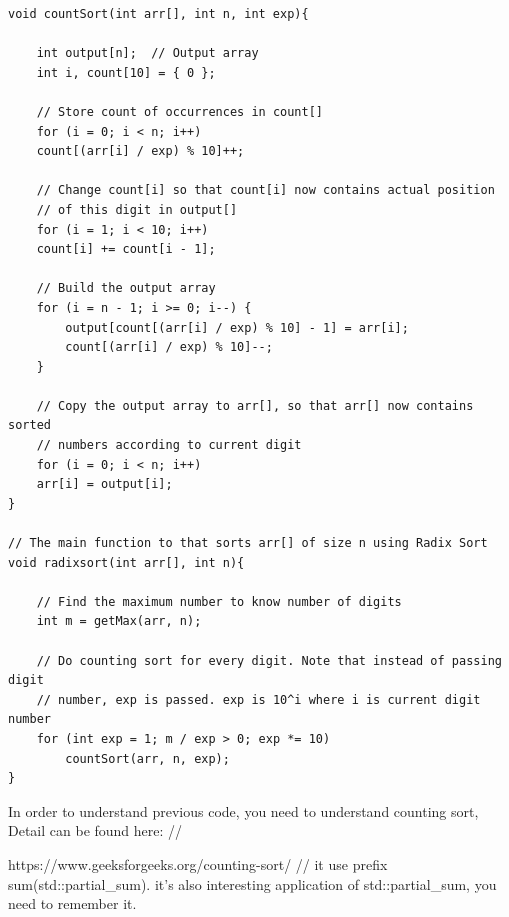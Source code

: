 \documentclass[a4paper,11pt,twoside]{book}
\begin{document}
\begin{lstlisting}
void countSort(int arr[], int n, int exp){
	
	int output[n];  // Output array
	int i, count[10] = { 0 };
	
	// Store count of occurrences in count[]
	for (i = 0; i < n; i++)
	count[(arr[i] / exp) % 10]++;
	
	// Change count[i] so that count[i] now contains actual position
	// of this digit in output[]
	for (i = 1; i < 10; i++)
	count[i] += count[i - 1];
	
	// Build the output array
	for (i = n - 1; i >= 0; i--) {
		output[count[(arr[i] / exp) % 10] - 1] = arr[i];
		count[(arr[i] / exp) % 10]--;
	}
	
	// Copy the output array to arr[], so that arr[] now contains sorted
	// numbers according to current digit
	for (i = 0; i < n; i++)
	arr[i] = output[i];
}

// The main function to that sorts arr[] of size n using Radix Sort
void radixsort(int arr[], int n){
	
	// Find the maximum number to know number of digits
	int m = getMax(arr, n);
	
	// Do counting sort for every digit. Note that instead of passing digit
	// number, exp is passed. exp is 10^i where i is current digit number
	for (int exp = 1; m / exp > 0; exp *= 10)
		countSort(arr, n, exp);
}	
\end{lstlisting}	
	
	\par In order to understand previous code, you need to understand counting sort, Detail can be found here: //
	
	https://www.geeksforgeeks.org/counting-sort/
	//
	it use prefix sum(std::partial\_sum). it's also interesting application of std::partial\_sum, you need to remember it. 
\end{document}
